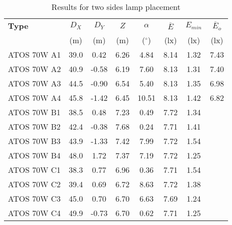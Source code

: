 \begin{table}[htb]
	\renewcommand{\arraystretch}{1.3}
	\caption{Results for two sides lamp placement}
 	\label{tab:twosideLamps}
	\centering
  \begin{tabular}{ l | c | c | c | c | c | c | c }
    \hline
    \textbf{Type} & $D_X$ & $D_Y$ & $Z$ & $\alpha$ & $\overline{E}$ & $E_{min}$ & $\overline{E}_o$\\ 
    & (m) & (m) & (m) & ($^\circ$) & (lx) & (lx) & (lx)\\ \hline
    ATOS 70W A1 & 39.0 & 0.42 & 6.26 & 4.84 & 8.14 & 1.32 & 7.43 \\ \hline
    ATOS 70W A2 & 40.9 & -0.58 & 6.19 & 7.60 & 8.13 & 1.31 & 7.40\\ \hline
    ATOS 70W A3 & 44.5 & -0.90 & 6.54 & 5.40 & 8.13 & 1.35 & 6.98\\ \hline
    ATOS 70W A4 & 45.8 & -1.42 & 6.45 & 10.51 & 8.13 & 1.42 & 6.82\\ \hline\hline
    ATOS 70W B1 & 38.5 & 0.48 & 7.23 & 0.49 & 7.72 & 1.34\\ \hline
    ATOS 70W B2 & 42.4 & -0.38 & 7.68 & 0.24 & 7.71 & 1.41\\ \hline
    ATOS 70W B3 & 43.9 & -1.33 & 7.42 & 7.99 & 7.72 & 1.54\\ \hline
    ATOS 70W B4 & 48.0 & 1.72 & 7.37 & 7.19 & 7.72 & 1.25\\ \hline\hline
    ATOS 70W C1 & 38.3 & 0.77 & 6.96 & 0.36 & 7.71 & 1.54\\ \hline
    ATOS 70W C2 & 39.4 & 0.69 & 6.72 & 8.63 & 7.72 & 1.38\\ \hline
    ATOS 70W C3 & 45.0 & 0.70 & 6.70 & 6.63 & 7.69 & 1.24\\ \hline
    ATOS 70W C4 & 49.9 & -0.73 & 6.70 & 0.62 & 7.71 & 1.25\\ \hline
  \end{tabular}
\end{table}